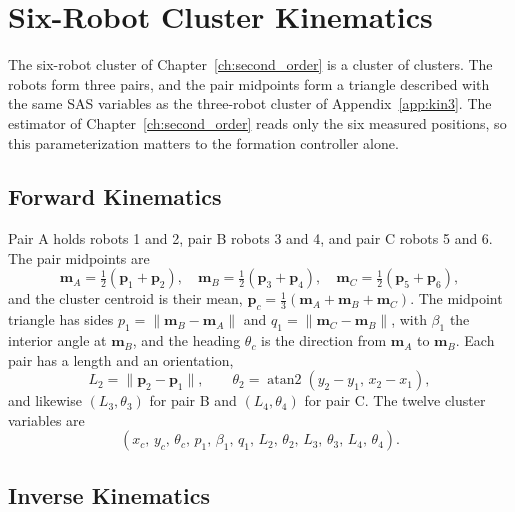 \chapter{Six-Robot Cluster Kinematics}
\label{app:kin6}

The six-robot cluster of Chapter~\ref{ch:second_order} is a cluster of
clusters. The robots form three pairs, and the pair midpoints form a
triangle described with the same SAS variables as the three-robot cluster
of Appendix~\ref{app:kin3}. The estimator of
Chapter~\ref{ch:second_order} reads only the six measured positions, so
this parameterization matters to the formation controller alone.

\section{Forward Kinematics}
\label{sec:appC:forward}

Pair A holds robots 1 and 2, pair B robots 3 and 4, and pair C robots 5
and 6. The pair midpoints are
\begin{equation}
    \mathbf{m}_A = \tfrac{1}{2}(\mathbf{p}_1 + \mathbf{p}_2), \quad
    \mathbf{m}_B = \tfrac{1}{2}(\mathbf{p}_3 + \mathbf{p}_4), \quad
    \mathbf{m}_C = \tfrac{1}{2}(\mathbf{p}_5 + \mathbf{p}_6),
    \label{eq:appC:midpoints}
\end{equation}
and the cluster centroid is their mean,
$\mathbf{p}_c = \tfrac{1}{3}(\mathbf{m}_A + \mathbf{m}_B + \mathbf{m}_C)$.
The midpoint triangle has sides
$p_1 = \lVert\mathbf{m}_B - \mathbf{m}_A\rVert$ and
$q_1 = \lVert\mathbf{m}_C - \mathbf{m}_B\rVert$, with $\beta_1$ the
interior angle at $\mathbf{m}_B$, and the heading $\theta_c$ is the
direction from $\mathbf{m}_A$ to $\mathbf{m}_B$. Each pair has a length
and an orientation,
\begin{equation}
    L_2 = \lVert\mathbf{p}_2 - \mathbf{p}_1\rVert, \qquad
    \theta_2 = \operatorname{atan2}(y_2 - y_1,\, x_2 - x_1),
    \label{eq:appC:pair}
\end{equation}
and likewise $(L_3, \theta_3)$ for pair B and $(L_4, \theta_4)$ for pair C.
The twelve cluster variables are
\begin{equation}
    (x_c,\, y_c,\, \theta_c,\, p_1,\, \beta_1,\, q_1,\,
     L_2,\, \theta_2,\, L_3,\, \theta_3,\, L_4,\, \theta_4).
    \label{eq:appC:state}
\end{equation}

\section{Inverse Kinematics}
\label{sec:appC:inverse}


